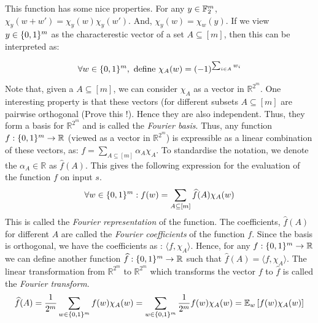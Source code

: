 This function has some nice properties. For any $y \in {\mathbb{F}}_2^m$, $\chi_y(w+w') = \chi_y(w)\chi_y(w')$. And, $\chi_y(w) = \chi_w(y)$. If we view $y \in \{0,1\}^m$ as the characterestic vector of a set $A \subseteq [m]$, then this can be interpreted as:

$$\forall w \in \{0,1\}^m, \textrm{ define } \chi_A(w) = (-1)^{\sum_{i \in A} w_i}$$

Note that, given a $A \subseteq [m]$, we can consider $\chi_A$ as a vector in $\mathbb{R}^{2^m}$. One interesting property is that these vectors (for different subsets $A \subseteq [m]$ are pairwise orthogonal (Prove this !). Hence they are also independent. Thus, they form a basis for $\mathbb{R}^{2^m}$ and is called the {\em Fourier basis}. Thus, any function $f: \{0,1\}^m \to \mathbb{R}$ (viewed as a vector in $\mathbb{R}^{2^m}$) is expressible as a linear combination of these vectors, as: $f = \sum_{A \subseteq [m]} \alpha_A \chi_A$. To standardise the notation, we denote the $\alpha_A \in \mathbb{R}$ as $\widehat{f}(A)$. This gives the following expression for the evaluation of the function $f$ on input $s$.
$$\forall w \in \{0,1\}^m : f(w) = \sum_{A \subseteq [m]} \widehat{f}(A) \chi_A(w)$$
This is called the {\em Fourier representation} of the function. The coefficients, $\widehat{f}(A)$ for different $A$ are called the  {\em Fourier coefficients} of the function $f$. 
Since the basis is orthogonal, we have the coefficients as : $\langle f,\chi_A \rangle$. Hence, for any $f:\{0,1\}^m \to \mathbb{R}$ we can define another function $\widehat{f}:\{0,1\}^m \to \mathbb{R}$ such that $\widehat{f}(A) = \langle f,\chi_A \rangle$. The linear transformation from $\mathbb{R}^{2^m}$ to $\mathbb{R}^{2^m}$ which transforms the vector $f$ to $\widehat{f}$ is called the {\em Fourier transform}.
$$\widehat{f}(A) = \frac{1}{2^m} \sum_{w \in \{0,1\}^m} f(w)  \chi_A(w) = \sum_{w \in \{0,1\}^m} \frac{1}{2^m}  f(w)  \chi_A(w) = {\mathbb E}_w\left[ f(w)\chi_A(w) \right]$$

